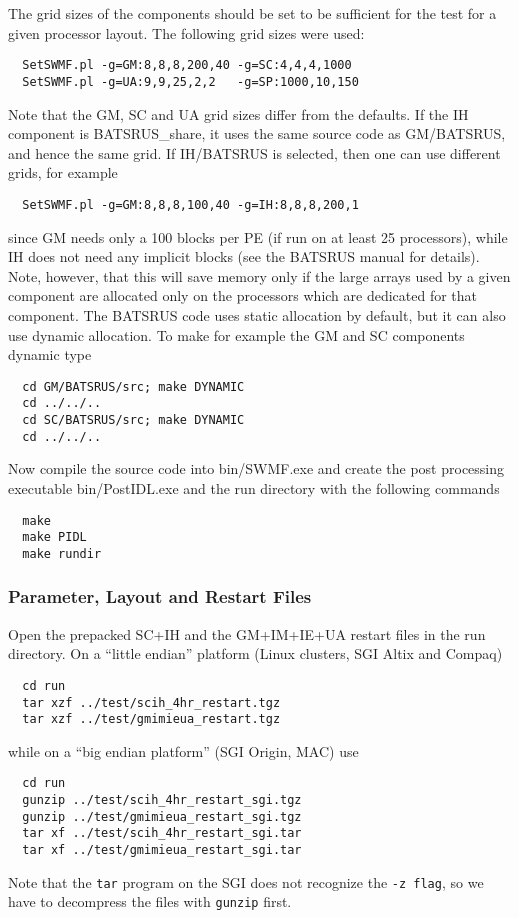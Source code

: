 The grid sizes of the components should be set to be sufficient for the test
for a given processor layout. The following grid sizes were used:
\begin{verbatim}
  SetSWMF.pl -g=GM:8,8,8,200,40 -g=SC:4,4,4,1000 
  SetSWMF.pl -g=UA:9,9,25,2,2   -g=SP:1000,10,150
\end{verbatim}
Note that the GM, SC and UA grid sizes differ from the defaults.
If the IH component is BATSRUS\_share, it uses the same source
code as GM/BATSRUS, and hence the same grid. If IH/BATSRUS is
selected, then one can use different grids, for example
\begin{verbatim}
  SetSWMF.pl -g=GM:8,8,8,100,40 -g=IH:8,8,8,200,1
\end{verbatim}
since GM needs only a 100 blocks per PE (if run on at least
25 processors), while IH does not need any implicit blocks 
(see the BATSRUS manual for details).
Note, however, that this will save memory only if the large arrays used
by a given component are allocated only on the processors which are dedicated 
for that component. The BATSRUS code uses static allocation by
default, but it can also use dynamic allocation. To make for example
the GM and SC components dynamic type
\begin{verbatim}
  cd GM/BATSRUS/src; make DYNAMIC
  cd ../../..
  cd SC/BATSRUS/src; make DYNAMIC
  cd ../../..
\end{verbatim}
Now compile the source code into bin/SWMF.exe 
and create the post processing executable bin/PostIDL.exe 
and the run directory with the following commands
\begin{verbatim}
  make
  make PIDL
  make rundir
\end{verbatim}

\subsubsection{Parameter, Layout and Restart Files}

Open the prepacked SC+IH and the GM+IM+IE+UA restart files in
the run directory.
On a ``little endian'' platform (Linux clusters, SGI Altix and Compaq)
\begin{verbatim}
  cd run
  tar xzf ../test/scih_4hr_restart.tgz
  tar xzf ../test/gmimieua_restart.tgz
\end{verbatim}
while on a ``big endian platform'' (SGI Origin, MAC) use
\begin{verbatim}
  cd run
  gunzip ../test/scih_4hr_restart_sgi.tgz
  gunzip ../test/gmimieua_restart_sgi.tgz
  tar xf ../test/scih_4hr_restart_sgi.tar
  tar xf ../test/gmimieua_restart_sgi.tar
\end{verbatim}
Note that the {\tt tar} program on the SGI does not recognize the 
{\tt -z flag}, so we have to decompress the files with {\tt gunzip} 
first.

